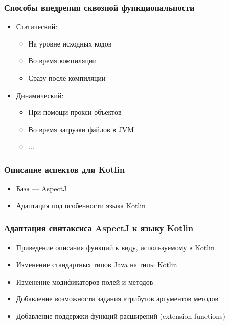 \documentclass[hyperref={pdftex,unicode}]{beamer}
\begin{document}
\begin{frame}[fragile=singleslide]
	\frametitle{Способы внедрения сквозной функциональности}
	\begin{itemize}
		\item Статический:
		      \begin{itemize}
		      	\item На уровне исходных кодов
		      	\item Во время компиляции
		      	\item Сразу после компиляции
		      \end{itemize}
		\item Динамический:
		      \begin{itemize}
		      	\item При помощи прокси-объектов
		      	\item Во время загрузки файлов в JVM
		      	\item ...
		      \end{itemize}
	\end{itemize}
\end{frame}
\begin{frame}[fragile=singleslide]
	\frametitle{Описание аспектов для Kotlin}
	

	
	\begin{itemize}
		\item База --- AspectJ
		\item Адаптация под особенности языка Kotlin
	\end{itemize}

\end{frame}

\begin{frame}[fragile=singleslide]
	\frametitle{Адаптация синтаксиса AspectJ к языку Kotlin}
	\begin{itemize}
		\item Приведение описания функций к виду, используемому в Kotlin
		\item Изменение стандартных типов Java на типы Kotlin
		\item Изменение модификаторов полей и методов
		\item Добавление возможности задания атрибутов аргументов методов
		\item Добавление поддержки функций-расширений (extension
		      functions)
	\end{itemize}
\end{frame}
\end{document}

